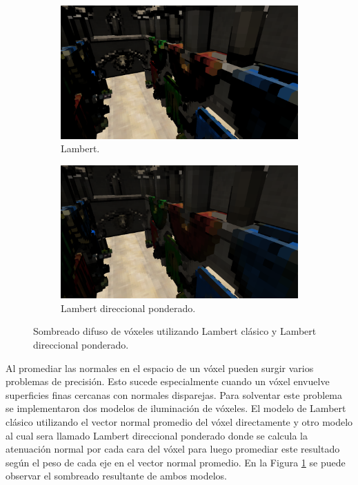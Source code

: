\begin{figure}[H]
	\centering
	\begin{subfigure}[t]{0.49\textwidth}
		\centering
		\captionsetup{justification=centering}
		\includegraphics[width=\linewidth]{media/classic_lambert.png}
		\caption*{Lambert.}
	\end{subfigure}%
	\hspace{0.01\textwidth}
	\begin{subfigure}[t]{0.49\textwidth}
		\centering
		\captionsetup{justification=centering}
		\includegraphics[width=\linewidth]{media/dir_lambert.png}
		\caption*{Lambert direccional ponderado.}
	\end{subfigure}%
	\caption{Sombreado difuso de vóxeles utilizando Lambert clásico y Lambert direccional ponderado.}
	\label{fig:lambert_dir_diff}
\end{figure}

Al promediar las normales en el espacio de un vóxel pueden surgir varios problemas de precisión. Esto sucede especialmente cuando un vóxel envuelve superficies finas cercanas con normales disparejas. Para solventar este problema se implementaron dos modelos de iluminación de vóxeles. El modelo de Lambert clásico utilizando el vector normal promedio del vóxel directamente y otro modelo al cual sera llamado Lambert direccional ponderado donde se calcula la atenuación normal por cada cara del vóxel para luego promediar este resultado según el peso de cada eje en el vector normal promedio. En la Figura \ref{fig:lambert_dir_diff} se puede observar el sombreado resultante de ambos modelos.


